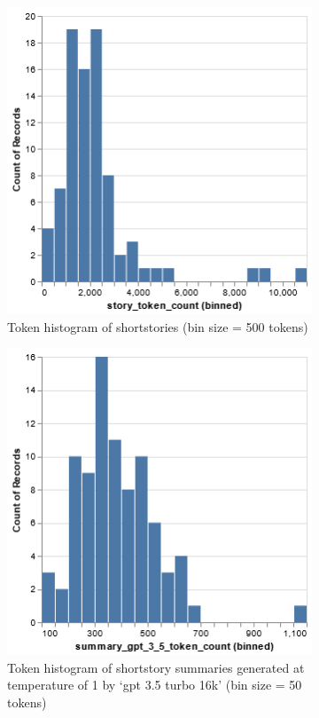 \documentclass[11pt]{article}
\begin{document}
\begin{figure}[h]
\caption{Token histograms}
\label{fig:tokens}
  \begin{subfigure}[t]{.45\textwidth}
  \includegraphics[scale=0.5]{story_tokens.png}
  \caption{Token histogram of shortstories (bin size = 500 tokens)}
  \end{subfigure}%
  \hfill     
  \begin{subfigure}[t]{.45\textwidth}
  \includegraphics[scale=0.5]{summary_tokens.png}
  \caption{Token histogram of shortstory summaries generated at temperature of 1 by `gpt 3.5 turbo 16k' (bin size = 50 tokens)}
  \end{subfigure}
  \begin{subfigure}[t]{.95\textwidth}

\end{subfigure}
\end{figure}
\end{document}
